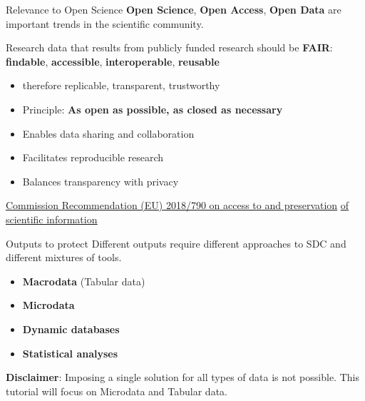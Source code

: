 \documentclass[
  ignorenonframetext,
  aspectratio=169,
]{beamer}
\providecommand{\tightlist}{%
  \setlength{\itemsep}{0pt}\setlength{\parskip}{0pt}}\usepackage{longtable,booktabs,array}
\begin{document}
\begin{frame}{Relevance to Open Science}
\label{relevance-to-open-science}
\textbf{Open Science}, \textbf{Open Access}, \textbf{Open Data} are
important trends in the scientific community.

Research data that results from publicly funded research should be
\textbf{FAIR}: \newline \textbf{findable}, \textbf{accessible},
\textbf{interoperable}, \textbf{reusable}

\begin{itemize}
\item
  therefore replicable, transparent, trustworthy
\item
  Principle: \textbf{As open as possible, as closed as necessary}
\item
  Enables data sharing and collaboration
\item
  Facilitates reproducible research
\item
  Balances transparency with privacy
\end{itemize}

\href{https://eur-lex.europa.eu/eli/reco/2018/790/oj}{\color{blue}\underline{Commission Recommendation (EU) 2018/790 on access to and preservation}}
\href{https://eur-lex.europa.eu/eli/reco/2018/790/oj}{\color{blue}\underline{of scientific information}}
\end{frame}

\begin{frame}{Outputs to protect}
\label{outputs-to-protect}
Different outputs require different approaches to SDC and different
mixtures of tools.

\begin{itemize}
\tightlist
\item
  \textbf{Macrodata} (Tabular data)
\item
  \textbf{Microdata}
\item
  \textbf{Dynamic databases}
\item
  \textbf{Statistical analyses}
\end{itemize}

\vspace{1cm}

\textbf{Disclaimer}: Imposing a single solution for all types of data is
not possible. \newline This tutorial will focus on Microdata and Tabular
data.
\end{frame}
\end{document}
